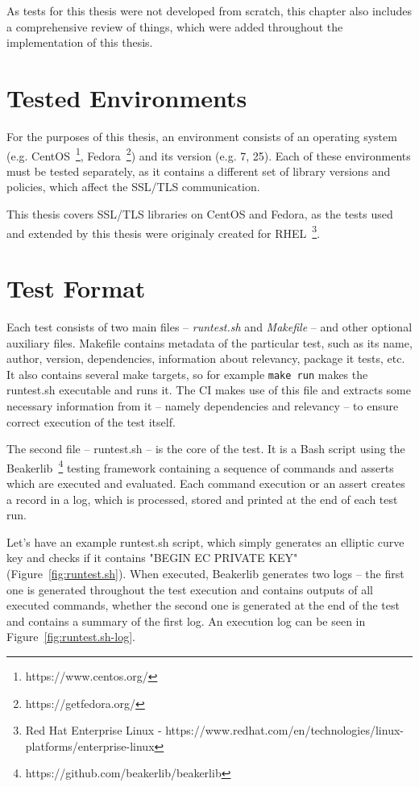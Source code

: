     As tests for this thesis were not developed from scratch, this chapter
    also includes a comprehensive review of things, which were added
    throughout the implementation of this thesis.

\section{Tested Environments}
    For the purposes of this thesis, an environment consists of an operating
    system (e.g.
    CentOS~\footnote{https://www.centos.org/},
    Fedora~\footnote{https://getfedora.org/}) and its version
    (e.g. 7, 25). Each of these environments must be tested separately, as
    it contains a different set of library versions and policies, which
    affect the SSL/TLS communication.

    This thesis covers SSL/TLS libraries on CentOS and Fedora, as the tests used
    and extended by this thesis were originaly created for
    RHEL~\footnote{Red Hat Enterprise Linux -
    https://www.redhat.com/en/technologies/linux-platforms/enterprise-linux}.

\section{Test Format}
    Each test consists of two main files -- \textit{runtest.sh} and \textit{Makefile}
    -- and other optional auxiliary files. Makefile contains metadata of the
    particular test, such as its name, author, version, dependencies, information
    about relevancy, package it tests, etc. It also contains several make
    targets, so for example \texttt{make run} makes the runtest.sh executable
    and runs it. The CI makes use of this file and extracts some necessary
    information from it -- namely dependencies and relevancy -- to ensure
    correct execution of the test itself.

    The second file -- runtest.sh -- is the core of the test. It is a Bash
    script using the Beakerlib~\footnote{https://github.com/beakerlib/beakerlib}
    testing framework containing a sequence of commands and asserts which
    are executed and evaluated. Each command execution or an assert
    creates a record in a log, which is processed, stored and printed at the end of
    each test run.

    Let's have an example runtest.sh script, which simply generates an elliptic
    curve key and checks if it contains "BEGIN EC PRIVATE KEY"
    (Figure~\ref{fig:runtest.sh}). When executed, Beakerlib generates two
    logs -- the first one is generated throughout the test execution and contains
    outputs of all executed commands, whether the second one is generated at
    the end of the test and contains a summary of the first log. An execution
    log can be seen in Figure~\ref{fig:runtest.sh-log}.

